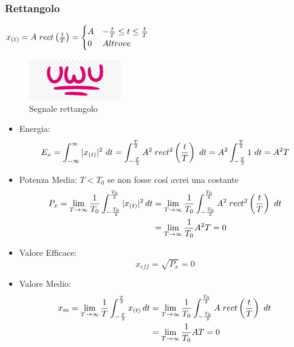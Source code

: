         \subsubsection{Rettangolo}
        $x_{(t)} = A\hspace{0.1cm}rect\left(\frac{t}{T}\right) =
            \begin{cases}
                A & -\frac{t}{T}\leq t\leq \frac{t}{T}\\
                0 & Altrove 
            \end{cases}
        $
        \begin{figure}[H]
            \centering
            \includegraphics[width=4cm]{media/uwu.png}
            \caption{Segnale rettangolo}
            \label{fig:segnale rettangolo}
        \end{figure}        
        \begin{itemize}
            \item {Energia:
                \[
                    E_{x} = \int_{-\infty}^{\infty} |x_{(t)}|^2 \ dt = \int_{-\frac{T}{2}}^{\frac{T}{2}} A^2 \hspace{0.1cm}rect^2\left(\frac{t}{T}\right)\ dt = A^2 \int_{-\frac{T}{2}}^{\frac{T}{2}}  1\ dt = A^2 T 
                \]
            }
            \item {Potenza Media:
                $T < T_0$ se non fosse cosí avrei una costante
                \begin{align}
                    P_{x} =\lim_{T\rightarrow\infty}  \frac{1}{T_0} \int_{-\frac{T_0}{2}}^{\frac{T_0}{2}}  |x_{(t)}|^2 \,dt & =\lim_{T\rightarrow\infty} \frac{1}{T_0}\int_{-\frac{T_0}{2}}^{\frac{T_0}{2}} A^2 \hspace{0.1cm}rect^2\left(\frac{t}{T}\right)\ dt \nonumber \\
                         & =\lim_{T\rightarrow\infty} \frac{1}{T_0} A^2 T = 0 \nonumber
                \end{align}
            }
            \item {Valore Efficace:
                \[
                    x_{eff} = \sqrt{P_{x}} = 0 
                \]
            }
            \item {Valore Medio:
                    \begin{align}
                        x_{m} = \lim_{T\rightarrow\infty} \frac{1}{T} \int_{-\frac{T}{2}}^{\frac{T}{2}}  x_{(t)} \,dt & = \lim_{T\rightarrow\infty} \frac{1}{T_0}\int_{-\frac{T_0}{2}}^{\frac{T_0}{2}} A\hspace{0.1cm}rect\left(\frac{t}{T}\right)\ dt \nonumber \\
                        & =\lim_{T\rightarrow\infty} \frac{1}{T_0} A T = 0 \nonumber
                    \end{align}
            }
        \end{itemize}
        
